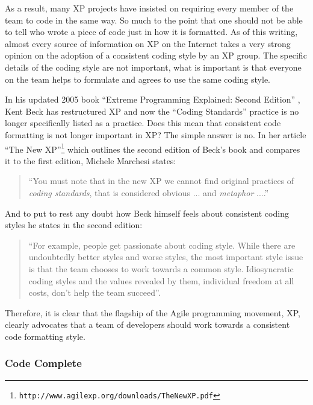 As a result, many XP projects have insisted on requiring every member of the
team to code in the same way.  So much to the point that one should not be
able to tell who wrote a piece of code just in how it is formatted.  As of
this writing, almost every source of information on XP on the Internet takes
a very strong opinion on the adoption of a consistent coding style by an XP
group.  The specific details of the coding style are not important, what is
important is that everyone on the team helps to formulate and agrees to use
the same coding style.

In his updated 2005 book ``Extreme Programming Explained: Second Edition''
{}\cite{ExtremeProgrammingExplained2nd04}, Kent Beck has restructured XP and
now the ``Coding Standards'' practice is no longer specifically listed as a
practice.  Does this mean that consistent code formatting is not longer
important in XP?  The simple answer is no.  In her article ``The New
XP''\footnote{ {}\texttt{http://www.agilexp.org/downloads/TheNewXP.pdf} }
which outlines the second edition of Beck's book and compares it to the first
edition, Michele Marchesi states:

\begin{quote}

``You must note that in the new XP we cannot find original practices of
{}\textit{coding standards}, that is considered obvious ... and
{}\textit{metaphor} ....''

\end{quote}

And to put to rest any doubt how Beck himself feels about consistent coding
styles he states in the second edition:

\begin{quote}

``For example, people get passionate about coding style.  While there are
undoubtedly better styles and worse styles, the most important style issue is
that the team chooses to work towards a common style.  Idiosyncratic coding
styles and the values revealed by them, individual freedom at all costs, don't
help the team succeed''.

\end{quote}

Therefore, it is clear that the flagship of the Agile programming movement,
XP, clearly advocates that a team of developers should work towards a
consistent code formatting style.

%
\subsubsection{Code Complete}
%

